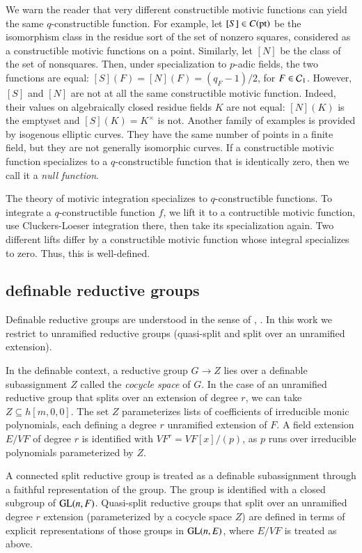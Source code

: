 We warn the reader that
very different constructible motivic functions can yield the same $q$-constructible function.  For example,
let $[S]\in C({\operatorname{pt}})$ be the isomorphism class in the residue sort of the set of nonzero squares, considered as a 
constructible motivic functions on a point.  Similarly, let $[N]$ be the class of the set of nonsquares.  Then, under specialization
to $p$-adic fields, the
two functions are equal:
$[S](F) = [N](F) = (q_F-1)/2$, for $F\in\mathcal C_1$. However, $[S]$ and $[N]$ are not at all the same constructible motivic function. Indeed,  their values on 
algebraically closed residue fields $K$ are not equal: $[N](K)$ is the emptyset and $[S](K) = K^\times$ is not.
Another family of examples is provided by isogenous elliptic curves.  They have the same number of points in a finite field, but
they are not generally isomorphic curves.
If a constructible motivic function specializes to a $q$-constructible function that is identically zero, then we call
it a {\it null function}.

The theory of motivic integration specializes to $q$-constructible functions. To integrate a $q$-constructible function $f$, we lift it to 
a contructible motivic function, use Cluckers-Loeser integration there, then take its specialization again.
Two different lifts differ by a constructible motivic function whose integral specializes to zero. Thus, this
is well-defined.

\subsection{definable reductive groups}

Definable reductive groups are understood in the sense of \cite{cluckers2011transfer}, \cite{gordon}.
In this work we restrict to unramified reductive groups (quasi-split and split over an unramified extension).

In the definable context, a reductive group $G\to Z$ lies over a definable subassignment
$Z$ called the {\it cocycle space} of $G$.  In the case of an unramified reductive group that splits over an extension of degree $r$, 
we can take $Z\subseteq h[m,0,0]$.  
The set $Z$ parameterizes lists of coefficients of irreducible monic 
polynomials, each  defining a degree $r$ unramified extension of $F$.  A field extension $E/VF$ of degree $r$ is identified
with $VF^r = VF[x]/(p)$, as $p$ runs over irreducible polynomials parameterized by $Z$.

A connected split reductive group is treated as a definable subassignment through a faithful representation of the group.
The group is identified with a closed subgroup of ${\operatorname{GL}}(n,F)$.  Quasi-split reductive groups that split over an unramified degree $r$
extension (parameterized by a cocycle space $Z$) are defined in terms of explicit representations of those groups
in ${\operatorname{GL}}(n,E)$, where $E/VF$ is treated as above.

